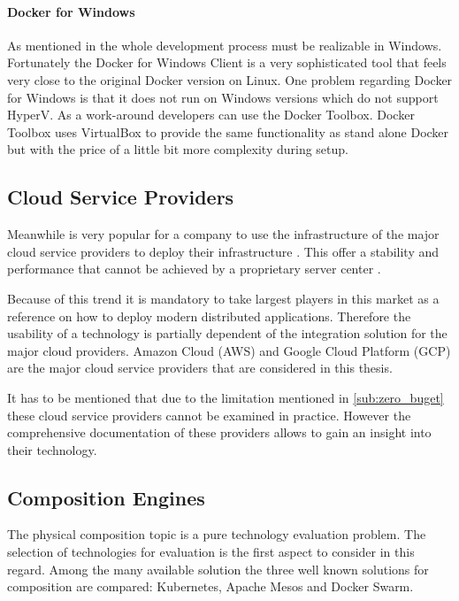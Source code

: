 \paragraph{Docker for Windows}

As mentioned in  the whole \og{} development
process must be realizable in Windows. Fortunately the Docker for Windows Client
is a very sophisticated tool that feels very close to the original Docker
version on Linux. One problem regarding Docker for Windows is that it does not
run on Windows versions which do not support HyperV. As a work-around developers
can use the Docker Toolbox. Docker Toolbox uses VirtualBox to provide the
same functionality as stand alone Docker but with the price of a little bit more
complexity during setup.

\subsection{Cloud Service Providers}

Meanwhile is very popular for a company to use the infrastructure of the major
cloud service providers to deploy their infrastructure \cite{roberts2016aws}
\cite{pronschinske2015turbine}. This offer a stability and performance that 
cannot be achieved by a proprietary server center \cite{gai2012towards}.

Because of this trend it is mandatory to take largest players in this market
as a reference on how to deploy modern distributed applications. Therefore the
usability of a technology is partially dependent of the integration solution for
the major cloud providers. Amazon Cloud (AWS) and Google Cloud Platform (GCP)
are the major cloud service providers that are considered in this thesis.

It has to be mentioned that due to the limitation mentioned in \autoref{sub:zero_buget}
these cloud service providers cannot be examined in practice. However the
comprehensive documentation of these providers allows to gain an insight into
their technology.

\subsection{Composition Engines}
\label{sub:composition_engines}

The physical \ms{} composition topic is a pure technology evaluation problem.
The selection of technologies for evaluation is the first aspect to consider in
this regard. Among the many available solution the three well known solutions
for \ms{} composition are compared: Kubernetes, Apache Mesos and Docker Swarm.


